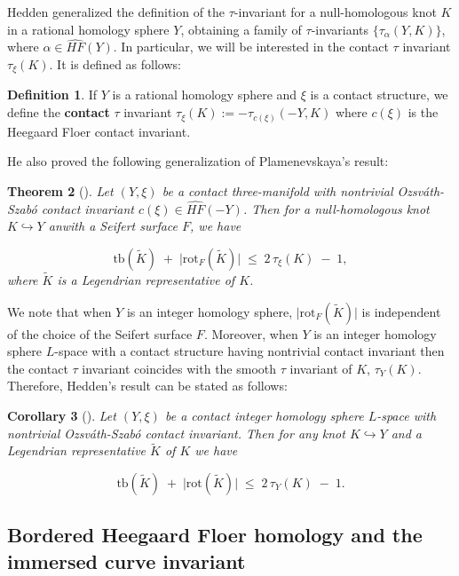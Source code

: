 \documentclass[12pt]{amsart}
\newtheorem{theorem}{Theorem}[section]
\newtheorem{corollary}[theorem]{Corollary}
\theoremstyle{definition}
\newtheorem{definition} [theorem] {Definition}
\theoremstyle{definition}
\newcommand{\rot}{\text{rot}}
\newcommand{\tb}{\text{tb}}
\begin{document}
Hedden generalized the definition of the $\tau$-invariant for a null-homologous knot $K$ in a rational homology sphere $Y$, obtaining a family of $\tau$-invariants $\{\tau_{\alpha}(Y,K)\}$, where $\alpha \in \widehat{HF}(Y)$. In particular, we will be interested in the contact $\tau$ invariant $\tau_{\xi}(K)$. It is defined as follows:

\begin{definition}
    If $Y$ is a rational homology sphere and $\xi$ is a contact structure, we define the \textbf{contact} $\tau$ invariant $\tau_{\xi}(K):= -\tau_{c(\xi)}(-Y,K)  $ where $c(\xi)$ is the Heegaard Floer contact invariant. 
\end{definition}

He also proved the following generalization of Plamenevskaya's result:


\begin{theorem}[\cite{HEDDENcontacttau}]
Let $(Y,\xi)$ be a contact three-manifold with nontrivial Ozsv\'ath-Szab\'o contact invariant
$c(\xi)\in \widehat{HF}(-Y)$. Then for a null-homologous knot $K \hookrightarrow Y $ anwith a Seifert surface $F$, we have

\[
\tb(\widetilde K)\;+\;\bigl|\rot_F(\widetilde K)\bigr|
\;\le\;
2\,\tau_\xi(K)\;-\;1,
\]
where $\widetilde K$ is a Legendrian representative of $K$. 
\end{theorem}


We note that when $Y$ is an integer homology sphere, $\bigl|\rot_F(\widetilde K)\bigr|$ is independent of the choice of the Seifert surface $F$.  Moreover, when $Y$ is an integer homology sphere $L$-space with a contact structure having nontrivial contact invariant then the contact $\tau$ invariant coincides with the smooth $\tau$ invariant of $K$, $\tau_Y(K)$. Therefore, Hedden's result can be stated as follows:

\begin{corollary}[\cite{HEDDENcontacttau}]\label{corhedden}
Let $(Y,\xi)$ be a  contact  integer homology sphere $L$-space with nontrivial Ozsv\'ath-Szab\'o contact invariant. Then for any knot $K \hookrightarrow Y $ and a Legendrian representative  $\widetilde K$ of $K$  we have

\[
\tb(\widetilde K)\;+\;\bigl|\rot(\widetilde K)|
\;\le\;
2\,\tau_Y(K)\;-\;1.
\] 
\end{corollary}


\subsection{Bordered Heegaard Floer homology and the immersed curve invariant}\label{subsec:bordered}
 
\end{document}
